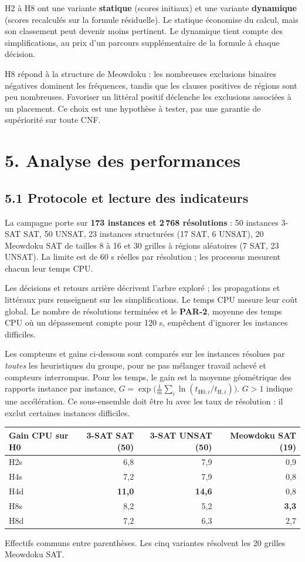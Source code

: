 \documentclass[11pt,a4paper]{article}
\begin{document}
H2 à H8 ont une variante \textbf{statique} (scores initiaux) et une
variante \textbf{dynamique} (scores recalculés sur la formule résiduelle).
Le statique économise du calcul, mais son classement peut devenir moins
pertinent. Le dynamique tient compte des simplifications, au prix d'un
parcours supplémentaire de la formule à chaque décision.

H8 répond à la structure de Meowdoku : les nombreuses exclusions binaires
négatives dominent les fréquences, tandis que les clauses positives de
régions sont peu nombreuses. Favoriser un littéral positif déclenche les
exclusions associées à un placement. Ce choix est une hypothèse à tester,
pas une garantie de supériorité sur toute CNF.

\section*{5. Analyse des performances}

\subsection*{5.1 Protocole et lecture des indicateurs}

La campagne porte sur \textbf{173 instances et 2\,768 résolutions} :
50 instances 3-SAT SAT, 50 UNSAT, 23 instances structurées
(17 SAT, 6 UNSAT), 20 Meowdoku SAT de tailles 8 à 16 et 30 grilles
à régions aléatoires (7 SAT, 23 UNSAT). La limite est de 60 s réelles
par résolution ; les processus mesurent chacun leur temps CPU.

Les décisions et retours arrière décrivent l'arbre exploré ; les
propagations et littéraux purs renseignent sur les simplifications.
Le temps CPU mesure leur coût global. Le nombre de résolutions terminées
et le \textbf{PAR-2}, moyenne des temps CPU où un dépassement compte pour
120 s, empêchent d'ignorer les instances difficiles.

Les compteurs et gains ci-dessous sont comparés sur les instances
résolues par \emph{toutes} les heuristiques du groupe, pour ne pas mélanger
travail achevé et compteurs interrompus. Pour les temps, le gain est la
moyenne géométrique des rapports instance par instance,
$G=\exp\!\bigl(\frac1m\sum_i\ln(t_{\mathrm{H0},i}/t_{\mathrm{H},i})\bigr)$.
$G>1$ indique une accélération. Ce sous-ensemble doit être lu avec les
taux de résolution : il exclut certaines instances difficiles.

\begin{center}\small
\begin{tabular}{lrrr}
\toprule
Gain CPU sur H0 & 3-SAT SAT (50) & 3-SAT UNSAT (50) & Meowdoku SAT (19) \\
\midrule
H2s & 6,8 & 7,9 & 0,9 \\
H4s & 7,2 & 7,9 & 0,8 \\
H4d & \textbf{11,0} & \textbf{14,6} & 0,8 \\
H8s & 8,2 & 5,2 & \textbf{3,3} \\
H8d & 7,2 & 6,3 & 2,7 \\
\bottomrule
\end{tabular}
\end{center}
{\small Effectifs communs entre parenthèses. Les cinq variantes résolvent
les 20 grilles Meowdoku SAT.}
\end{document}
